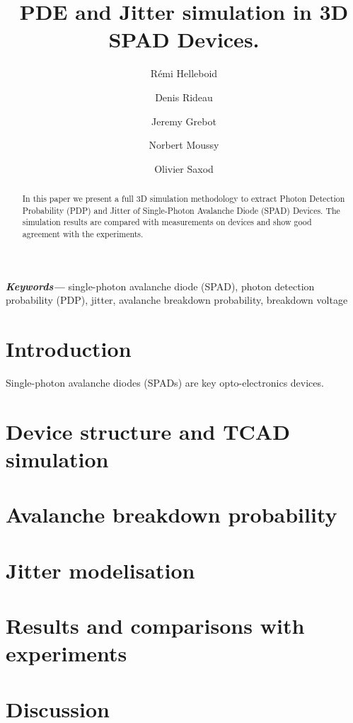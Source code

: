\documentclass[12pt,a4paper,twocolumn]{article}
\title{PDE and Jitter simulation in 3D SPAD Devices.}
\author[1]{Rémi Helleboid}
\author[1]{Denis Rideau}
\author[1]{Jeremy Grebot}
\author[2]{Norbert Moussy}
\author[2]{Olivier Saxod}
\affil[1]{ST Microelectronics, Crolles, France}
\affil[2]{CEA LETI, Grenoble, France}
\date{}                     %
\providecommand{\keywords}[1]
{
  \small	
  \textbf{\textit{Keywords---}} #1
}
\begin{document}
\maketitle

\begin{abstract}
In this paper we present a full 3D simulation methodology to extract Photon Detection Probability (PDP) and Jitter of Single-Photon Avalanche Diode (SPAD) Devices. The simulation results are compared with measurements on devices and show good agreement with the experiments.\\
\end{abstract}

\keywords{single-photon avalanche diode (SPAD), photon detection probability (PDP), jitter, avalanche breakdown probability, breakdown voltage}

\section{Introduction}
Single-photon avalanche diodes (SPADs) are key opto-electronics devices.


\section{Device structure and TCAD simulation}

\section{Avalanche breakdown probability}

\section{Jitter modelisation}

\section{Results and comparisons with experiments}

\section{Discussion}



\nocite{*}


\end{document}
